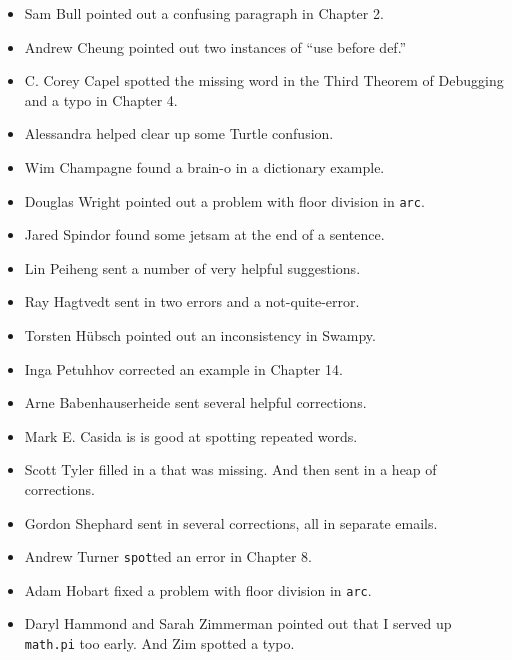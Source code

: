 \documentclass[10pt]{book}
\begin{document}
\begin{itemize}
\item Sam Bull pointed out a confusing paragraph in Chapter 2.

\item Andrew Cheung pointed out two instances of ``use before def.''

\item C. Corey Capel spotted the missing word in the Third Theorem
of Debugging and a typo in Chapter 4.

\item Alessandra helped clear up some Turtle confusion.

\item Wim Champagne found a brain-o in a dictionary example.

\item Douglas Wright pointed out a problem with floor division in
{\tt arc}.

\item Jared Spindor found some jetsam at the end of a sentence.

\item Lin Peiheng sent a number of very helpful suggestions.

\item Ray Hagtvedt sent in two errors and a not-quite-error.

\item Torsten H\"{u}bsch pointed out an inconsistency in Swampy.

\item Inga Petuhhov corrected an example in Chapter 14.

\item Arne Babenhauserheide sent several helpful corrections.

\item Mark E. Casida is is good at spotting repeated words.

\item Scott Tyler filled in a that was missing.  And then sent in
a heap of corrections.

\item Gordon Shephard sent in several corrections, all in separate
emails.

\item Andrew Turner {\tt spot}ted an error in Chapter 8.

\item Adam Hobart fixed a problem with floor division in {\tt arc}.

\item Daryl Hammond and Sarah Zimmerman pointed out that I served
up {\tt math.pi} too early.  And Zim spotted a typo.


\end{itemize}
\end{document}
